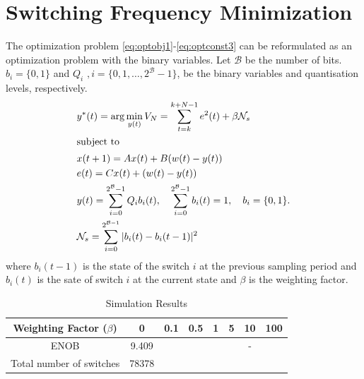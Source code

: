 \documentclass[a4paper]{article}
\begin{document}
\section{Switching Frequency Minimization}
The optimization problem \eqref{eq:optobj1}-\eqref{eq:optconst3} can be reformulated as an optimization problem with the binary variables. Let $\mathcal{B}$ be the number of bits.  $b_{i} = \{0,1\}$ and $Q_{i}$ $, i = \{0, 1, \ldots, 2^{\mathcal{B}}-1\}$, be the binary variables and quantisation levels, respectively. 
\begin{align}
		& y^{\ast}(t) = \arg  \min_{y(t) }	V_{N}  = \sum_{t=k}^{k+N-1} e^{2}(t) + \beta \mathcal{N}_{s}\label{eq:optobj121}\\
		\intertext{subject to}
		&x(t+1) = A x(t) + B (w(t)-y(t))	\label{eq:optconst122}	\\
		&e(t) = Cx(t) + (w(t)-y(t))	\label{eq:optconst223}	\\
		&y(t) = \sum_{i = 0}^{2^{\mathcal{B}}-1} Q_{i}b_{i}(t), \quad \sum_{i = 0}^{2^{\mathcal{B}}-1}b_{i}(t)  =1, \quad b_{i} = \{0,1\}. \label{eq:optconst324} \\
		&\mathcal{N}_{s} = \sum_{i = 0}^{2^{\mathcal{B}-1}} |b_{i}(t) - b_{i}(t-1)|^{2}
	\end{align}
	where $b_{i}(t-1)$ is the state of the switch $i$ at the previous sampling period and $b_{i}(t)$ is the sate of switch $i$ at the current state and $\beta$ is the weighting factor. 


\begin{table}[!h]
\caption{Simulation Results}
	\centering
	\begin{tabular}{|c|c|c|c|c|c|c|c|}
	\hline
	  Weighting Factor ($\beta$) & 0 & 0.1 & 0.5 & 1 & 5 & 10 & 100  \\
        \hline
        ENOB & 9.409  &  &   &   &  & - & \\
        \hline
        Total number of switches & 78378 & &  &  & & & \\
         \hline
	\end{tabular}		



\end{table}
\end{document}
